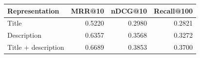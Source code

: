 \begin{tabular}{lrrr}
    \toprule
    Representation & MRR@10 & nDCG@10 & Recall@100 \\
    \midrule
    Title & 0.5220 & 0.2980 & 0.2821 \\
    Description & 0.6357 & 0.3568 & 0.3272 \\
    Title + description & 0.6689 & 0.3853 & 0.3700 \\
    \bottomrule
\end{tabular}
